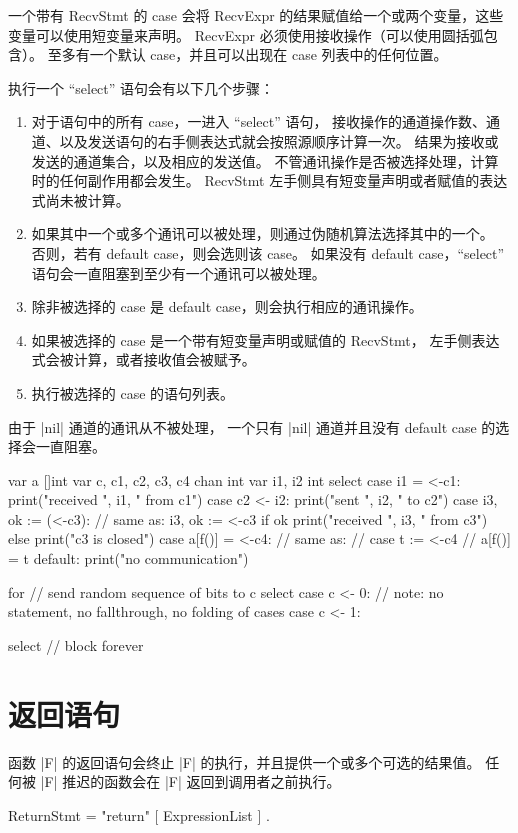 一个带有 RecvStmt 的 case 会将 RecvExpr 的结果赋值给一个或两个变量，这些变量可以使用短变量来声明。
RecvExpr 必须使用接收操作（可以使用圆括弧包含）。
至多有一个默认 case，并且可以出现在 case 列表中的任何位置。

执行一个 ``select'' 语句会有以下几个步骤：
\begin{enumerate}
\item 
对于语句中的所有 case，一进入 ``select'' 语句，
接收操作的通道操作数、通道、以及发送语句的右手侧表达式就会按照源顺序计算一次。
结果为接收或发送的通道集合，以及相应的发送值。
不管通讯操作是否被选择处理，计算时的任何副作用都会发生。
RecvStmt 左手侧具有短变量声明或者赋值的表达式尚未被计算。
\item 
如果其中一个或多个通讯可以被处理，则通过伪随机算法选择其中的一个。
否则，若有 default case，则会选则该 case。
如果没有 default case，``select'' 语句会一直阻塞到至少有一个通讯可以被处理。
\item 
除非被选择的 case 是 default case，则会执行相应的通讯操作。
\item 
如果被选择的 case 是一个带有短变量声明或赋值的 RecvStmt，
左手侧表达式会被计算，或者接收值会被赋予。
\item 
执行被选择的 case 的语句列表。
\end{enumerate}

由于 \code|nil| 通道的通讯从不被处理，
一个只有 \code|nil| 通道并且没有 default  case 的选择会一直阻塞。
\begin{golang}
var a []int
var c, c1, c2, c3, c4 chan int
var i1, i2 int
select {
case i1 = <-c1:
	print("received ", i1, " from c1\n")
case c2 <- i2:
	print("sent ", i2, " to c2\n")
case i3, ok := (<-c3):  // same as: i3, ok := <-c3
	if ok {
		print("received ", i3, " from c3\n")
	} else {
		print("c3 is closed\n")
	}
case a[f()] = <-c4:
	// same as:
	// case t := <-c4
	//	a[f()] = t
default:
	print("no communication\n")
}

for {  // send random sequence of bits to c
	select {
	case c <- 0:  // note: no statement, no fallthrough, no folding of cases
	case c <- 1:
	}
}

select {}  // block forever
\end{golang}


\section{返回语句}
函数 \code|F| 的返回语句会终止 \code|F| 的执行，并且提供一个或多个可选的结果值。
任何被 \code|F|  推迟的函数会在 \code|F| 返回到调用者之前执行。
\begin{EBNF}
ReturnStmt = "return" [ ExpressionList ] .
\end{EBNF}

